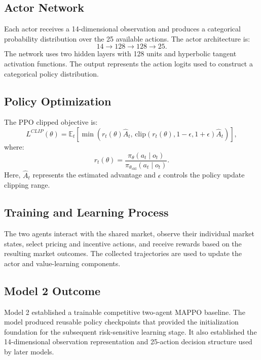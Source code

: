 \documentclass[conference]{IEEEtran}
\begin{document}
\subsection{Actor Network}
Each actor receives a 14-dimensional observation and produces a categorical probability distribution over the 25 available actions. The actor architecture is:
\begin{equation}
  14 \rightarrow 128 \rightarrow 128 \rightarrow 25.
\end{equation}
The network uses two hidden layers with 128 units and hyperbolic tangent activation functions. The output represents the action logits used to construct a categorical policy distribution.

\subsection{Policy Optimization}
The PPO clipped objective \cite{schulman2017ppo} is:
\begin{equation}
  L^{CLIP}(\theta) = \mathbb{E}_t\!\left[\min\!\left(r_t(\theta)\hat{A}_t,\,
  \mathrm{clip}\!\left(r_t(\theta),1-\epsilon,1+\epsilon\right)\hat{A}_t\right)\right],
\end{equation}
where:
\begin{equation}
  r_t(\theta) = \frac{\pi_\theta(a_t \mid o_t)}{\pi_{\theta_{\mathrm{old}}}(a_t \mid o_t)}.
\end{equation}
Here, $\hat{A}_t$ represents the estimated advantage and $\epsilon$ controls the policy update clipping range.

\subsection{Training and Learning Process}
The two agents interact with the shared market, observe their individual market states, select pricing and incentive actions, and receive rewards based on the resulting market outcomes. The collected trajectories are used to update the actor and value-learning components.

\subsection{Model 2 Outcome}
Model 2 established a trainable competitive two-agent MAPPO baseline. The model produced reusable policy checkpoints that provided the initialization foundation for the subsequent risk-sensitive learning stage. It also established the 14-dimensional observation representation and 25-action decision structure used by later models.
\end{document}

